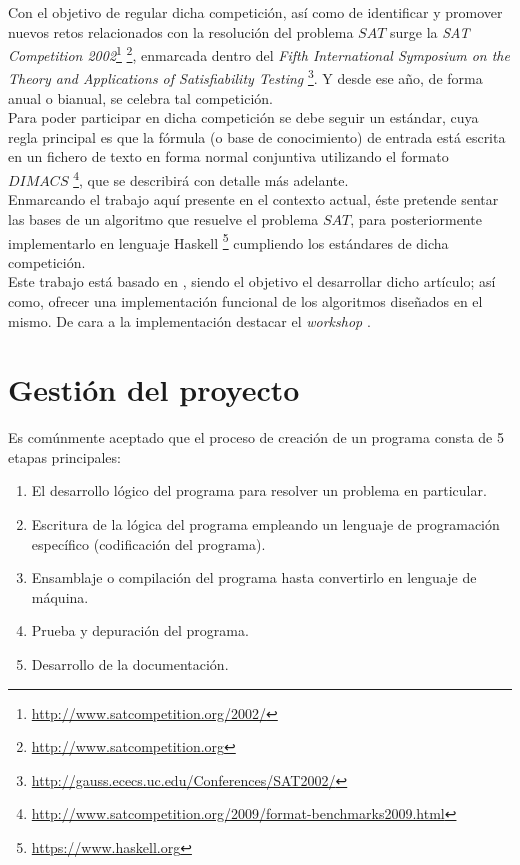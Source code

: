 Con el objetivo de regular dicha competición, así como de identificar y promover nuevos retos relacionados con la resolución del problema $SAT$ surge la \textit{SAT Competition 2002}\footnote{\url{http://www.satcompetition.org/2002/}} \footnote{\url{http://www.satcompetition.org}}, enmarcada dentro del \textit{Fifth  International Symposium on the Theory and Applications of Satisfiability Testing} \footnote{\url{http://gauss.ececs.uc.edu/Conferences/SAT2002/}}. Y desde ese año, de forma anual o bianual, se celebra tal competición. \\

Para poder participar en dicha competición se debe seguir un estándar, cuya regla principal es que la fórmula (o base de conocimiento) de entrada está escrita en un fichero de texto en forma normal conjuntiva utilizando el formato $DIMACS$ \footnote{\url{http://www.satcompetition.org/2009/format-benchmarks2009.html}}, que se describirá con detalle más adelante.\\

Enmarcando el trabajo aquí presente en el contexto actual, éste pretende sentar las bases de un algoritmo que resuelve el problema $SAT$, para posteriormente implementarlo en lenguaje Haskell \footnote{\url{https://www.haskell.org}} cumpliendo los estándares de dicha competición.\\

Este trabajo está basado en \cite{original}, siendo el objetivo el desarrollar dicho artículo; así como, ofrecer una implementación funcional de los algoritmos diseñados en el mismo. De cara a la implementación destacar el \textit{workshop} \cite{formulasYpolinomios}.

\section*{Gestión del proyecto}
Es comúnmente aceptado que el proceso de creación de un programa consta de 5 etapas principales:

\begin{enumerate}
\item El desarrollo lógico del programa para resolver un problema en particular.
\item Escritura de la lógica del programa empleando un lenguaje de programación específico (codificación del programa).
\item Ensamblaje o compilación del programa hasta convertirlo en lenguaje de máquina.
\item Prueba y depuración del programa.
\item Desarrollo de la documentación.
\end{enumerate}

